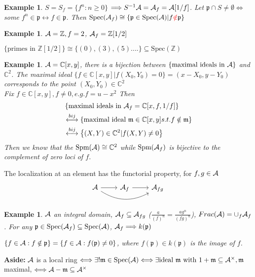 \documentclass[11pt]{article}
\newtheorem{ex}[thm]{Example}
\newcommand{\cplx}{\mathbb C}
\newcommand{\intg}{\mathbb Z}
\newcommand{\scm}{{\mathfrak m}}
\newcommand{\scp}{{\mathfrak p}}
\newcommand{\cala}{{\cal A}}
\newcommand{\Lrta}{\Longrightarrow}
\newcommand{\llrta}{\longleftrightarrow}
\newcommand{\Llrta}{\Longleftrightarrow}
\begin{document}
\begin{ex}
$S=S_f=\{f^n:n\geq0\}$
$\Lrta S^{-1}\cala=\cala_f=\cala[1/f]$. Let $\scp\cap S\neq \emptyset\Llrta$ some $f^n\in \scp\llrta f\in \scp$.
Then $\text{Spec}(\cala_f)\cong \{\scp\in \text{Spec}(\cala)|f{\color{red}\notin} \scp\}$
\end{ex}

\begin{ex}
$\cala=\intg,f=2$, $\cala_f=\intg[1/2]$

$\{\text{primes in }\intg[1/2]\}\cong \{(0),(3),(5)....\}\subseteq\text{Spec}(\intg)$
\end{ex}

\begin{ex}
$\cala=\cplx[x,y]$, there is a bijection between $\{\text{maximal ideals in }\cala\}$ and $\cplx^2$.
The maximal ideal $\{f\in \cplx[x,y]| f(X_0,Y_0)=0\}=(x-X_0, y-Y_0)$ corresponds to the point $(X_0,Y_0)\in \cplx^2$\\
Fix $f\in \cplx[x,y], f\neq 0, e.g. f=u-x^2$
Then 
$$
\begin{aligned}
&\left\{ \text{maximal ideals in  }\cala_f=\cplx[x,f,1/f]\right\}\\
&\overset{bij}{\longleftrightarrow} \left\{\text{maximal ideal }\scm\in \cplx[x,y] s.t. f\notin \scm\right\}\\
& \overset{bij}{\longleftrightarrow}\left\{(X,Y)\in \cplx^2|f(X,Y)\neq 0\right\}
\end{aligned}
$$
Then we know that the $\text{Spm}(\cala)\cong \cplx^2$ while $\text{Spm}(\cala_f)$ is bijective to the complement of zero loci of $f$.
\end{ex}


The localization at an element has the functorial property, for $f,g\in\cala$
\[
\begin{tikzcd}
\cala\ar[r]\ar[rr,bend right]&\cala_f\ar[r]&\cala_{fg}  
\end{tikzcd}
\] 


\begin{ex}
$\cala$ an integral domain, $\cala_f\subseteq \cala_{fg}$ ($\frac{a}{(f)^n}=\frac{a g^n}{(fg)^n}$), $Frac(\cala)=\cup_f\cala_f$. For any $\scp\in \text{Spec}(\cala_f)\subseteq\text{Spec}(\cala)$, $\cala_f\Lrta k(\scp)$ 

$\{f\in \cala:f\notin \scp\}=\{f\in \cala:f(\scp)\neq 0\}$, where $f(\scp)\in k(\scp)$ is the image of $f$.
\end{ex}

\textbf{Aside:} $\cala$ is a local ring  $\Llrta\exists !\scm\in \text{Spec}(\cala)\Llrta \exists \text{ideal }\scm\text{ with }1+\scm\subseteq \cala^\times, \scm$ maximal,
$\Llrta \cala-\scm\subseteq \cala^\times$
\end{document}
